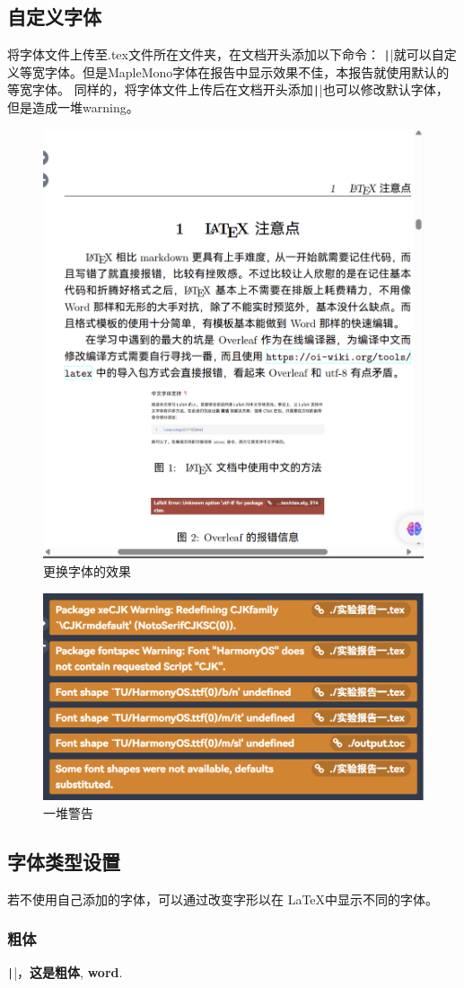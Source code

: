 \documentclass[fontset=ubuntu]{ctexart}
\begin{document}
\subsection{自定义字体}
将字体文件上传至.tex文件所在文件夹，在文档开头添加以下命令：
\texttt|\setmonofont{MapleMono.ttf}|就可以自定义等宽字体。但是MapleMono字体在报告中显示效果不佳，本报告就使用默认的等宽字体。
同样的，将字体文件上传后在文档开头添加\texttt|\setCJKmainfont{}|也可以修改默认字体，但是造成一堆warning。
\begin{figure}[htb]
    \centering
    \includegraphics[width=0.5\linewidth]{Font.png}
    \caption{更换字体的效果}
    \label{fig:Font}
\end{figure}

\begin{figure}[htb]
    \centering
    \includegraphics[width=0.5\linewidth]{Warning.png}
    \caption{一堆警告}
    \label{fig:Warning}
\end{figure}

\subsection{字体类型设置}
若不使用自己添加的字体，可以通过改变字形以在 \LaTeX 中显示不同的字体。

\subsubsection{粗体}
\texttt|\textbf{}|，\textbf{这是粗体}, \textbf{word}.
\end{document}
